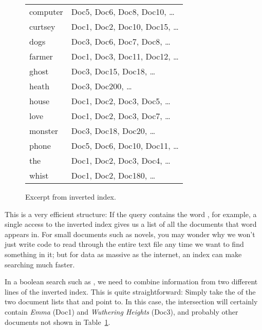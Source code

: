 \begin{figure}[htb!]
\begin{tabular}{l@{\quad$\to$\quad}l}
computer & Doc5, Doc6, Doc8, Doc10, \ldots\\
curtsey & Doc1, Doc2, Doc10, Doc15, \ldots \\
dogs & Doc3, Doc6, Doc7, Doc8, \ldots \\
farmer & Doc1, Doc3, Doc11, Doc12, \ldots \\
ghost & Doc3, Doc15, Doc18, \ldots \\ 
heath & Doc3, Doc200, \ldots \\
house      &  Doc1, Doc2, Doc3, Doc5, \ldots  \\
love      &  Doc1, Doc2, Doc3, Doc7, \ldots  \\
monster & Doc3, Doc18, Doc20, \ldots \\
phone & Doc5, Doc6, Doc10, Doc11, \ldots \\
the & Doc1, Doc2, Doc3, Doc4, \ldots \\
whist & Doc1, Doc2, Doc180, \ldots \\
\end{tabular}
\caption{Excerpt from inverted index.}
\label{fig:inverted-index}
\end{figure}

This is a very efficient structure:  If the query contains the word ,  for example,  a single access to the inverted index gives us   a list of all the documents that  word appears in.    For small documents such as novels, you may wonder why we won't just write code to read through the entire text file any time we want to find something in it; but for data as massive as the internet, an index can make searching much faster.

  
In a boolean search such as , we need to
combine information from two different lines of the
inverted index.  This is quite straightforward: Simply take the
 of the two document lists that
 and  point to.  In this case,
the intersection will certainly contain \textit{Emma} (Doc1) and \textit{Wuthering Heights} (Doc3), and probably other documents not shown in Table~\ref{fig:inverted-index}.

